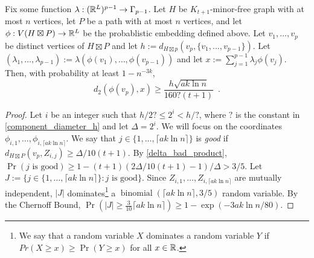 \documentclass{patmorin}
\newcommand{\defin}[1]{\emph{\textcolor{brightmaroon}{#1}}}
\begin{document}
\begin{lem}\label{crux}
  Fix some function $\lambda:(\mathbb{R}^{L})^{p-1}\to \Gamma_{p-1}$. Let $H$ be $K_{t+1}$-minor-free graph with at most $n$ vertices, let $P$ be a path with at most $n$ vertices, and let $\phi:V(H\boxtimes P)\to\mathbb{R}^L$ be the probablistic embedding defined above.  Let $v_1,\ldots,v_p$ be distinct vertices of $H\boxtimes P$ and let $h:=d_{H\boxtimes p}(v_p,\{v_1,\ldots,v_{p-1}\})$.  Let $(\lambda_1,\ldots,\lambda_{p-1}):=\lambda(\phi(v_1),\ldots,\phi(v_{p-1}))$ and let $x:=\sum_{j=1}^{p-1}\lambda_j\phi(v_j)$.
  Then, with probability at least $1-n^{-3k}$,
  \[
    d_2(\phi(v_p),x)\ge \frac{h\sqrt{ak\ln n}}{160?(t+1)} \enspace
  . \]
\end{lem}

\begin{proof}
  Let $i$ be an integer such that $h/2?\le 2^i < h/?$, where $?$ is the constant in \cref{component_diameter_h} and let $\Delta=2^i$.  We will focus on the coordinates $\phi_{i,1},\ldots,\phi_{i,\lceil a k\ln n\rceil}$.  We say that $j\in\{1,\ldots,\lceil a k\ln n\rceil\}$ is \defin{good} if $d_{H\boxtimes P}(v_p,Z_{i,j})\ge \Delta/10(t+1)$.  By \cref{delta_bad_product},  $\Pr(\text{$j$ is good})\ge 1-(t+1)(2\Delta/10(t+1)-1)/\Delta > 3/5$. Let $J:=\{j\in\{1,\ldots,\lceil a k\ln n\rceil\}:\text{$j$ is good}\}$.  Since $Z_{i,1},\ldots,Z_{i,\lceil a k\ln n\rceil}$ are mutually independent, $|J|$ dominates\footnote{We say that a random variable $X$ dominates a random variable $Y$ if $Pr(X\ge x)\ge\Pr(Y\ge x)$ for all $x\in\mathbb{R}$.} a $\operatorname{binomial}(\lceil a k\ln n\rceil,3/5)$ random variable. By the Chernoff Bound, $\Pr(|J|\ge \tfrac{3}{10}\lceil a k\ln n\rceil)\ge 1-\exp(-3ak\ln n/80)$.


\end{proof}
\end{document}
